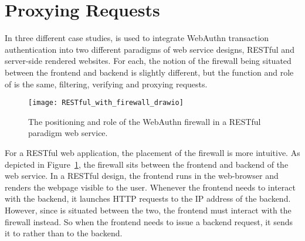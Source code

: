 


\section{Proxying Requests}\label{Sec:ProxyingRequests}

In three different case studies, \sys{} is used to integrate WebAuthn transaction authentication into two different paradigms of web service designs, RESTful and server-side rendered websites. For each, the notion of the firewall being situated between the frontend and backend is slightly different, but the function and role of \sys{} is the same, filtering, verifying and proxying requests. 

\begin{figure}[h]
  \centering
  \texttt{[image: RESTful\_with\_firewall\_drawio]}
  \caption{The positioning and role of the WebAuthn firewall in a RESTful paradigm web service.}
  \label{Fig:ProxyingRequestsRESTful}
\end{figure}



For a RESTful web application, the placement of the firewall is more intuitive. As depicted in Figure~\ref{Fig:ProxyingRequestsRESTful}, the firewall sits between the frontend and backend of the web service. In a RESTful design, the frontend runs in the web-browser and renders the webpage visible to the user. Whenever the frontend needs to interact with the backend, it launches HTTP requests to the IP address of the backend. However, since \sys{} is situated between the two, the frontend must interact with the firewall instead. So when the frontend needs to issue a backend request, it sends it to \sys{} rather than to the backend. 

